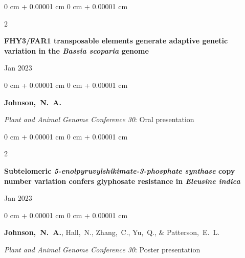 \documentclass[10pt, letterpaper]{article}
\newenvironment{onecolentry}{
    \begin{adjustwidth}{
        0 cm + 0.00001 cm
    }{
        0 cm + 0.00001 cm
    }
}{
    \end{adjustwidth}
} %
\newenvironment{twocolentry}[2][]{
    \onecolentry
    \def\secondColumn{#2}
    \setcolumnwidth{\fill, 4.5 cm}
    \begin{paracol}{2}
}{
    \switchcolumn \raggedleft \secondColumn
    \end{paracol}
    \endonecolentry
} %
\begin{document}
        \begin{samepage}
            \begin{twocolentry}{
                Jan 2023
            }
                \textbf{FHY3/FAR1 transposable elements generate adaptive genetic variation in the \textit{Bassia scoparia} genome}
            \end{twocolentry}

            \vspace{0.10 cm}
            
            \begin{onecolentry}
                \mbox{\textbf{Johnson, N. A.}}

                \vspace{0.10 cm}
                
                \textit{Plant and Animal Genome Conference 30}: Oral presentation
            \end{onecolentry}
        \end{samepage}      


        \vspace{0.2 cm}
        

        \begin{samepage}
            \begin{twocolentry}{
                Jan 2023
            }
                \textbf{Subtelomeric \textit{5-enolpyruvylshikimate-3-phosphate synthase} copy number variation confers glyphosate resistance in \textit{Eleusine indica}}
            \end{twocolentry}

            \vspace{0.10 cm}
            
            \begin{onecolentry}
                \mbox{\textbf{Johnson, N. A.}}, \mbox{Hall, N.}, \mbox{Zhang, C.}, \mbox{Yu, Q.}, \& \mbox{Patterson, E. L.}

                \vspace{0.10 cm}
                
                \textit{Plant and Animal Genome Conference 30}: Poster presentation
            \end{onecolentry}
        \end{samepage}   


        \vspace{0.2 cm}
        
\end{document}
